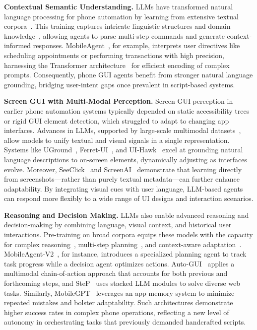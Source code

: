 \noindent\textbf{Contextual Semantic Understanding.}
LLMs have transformed natural language processing for phone automation by learning from extensive textual corpora~\cite{vaswani2017attention,brown2020language,radford2018improving,devlin2018bert,wen2024autodroid,zhang2023appagent}. This training captures intricate linguistic structures and domain knowledge~\cite{karanikolas2023large}, allowing agents to parse multi-step commands and generate context-informed responses. MobileAgent~\cite{wang2024mobileagentv1}, for example, interprets user directives like scheduling appointments or performing transactions with high precision, harnessing the Transformer architecture~\cite{vaswani2017attention} for efficient encoding of complex prompts. Consequently, phone GUI agents benefit from stronger natural language grounding, bridging user-intent gaps once prevalent in script-based systems.


\noindent\textbf{Screen GUI with Multi-Modal Perception.}
Screen GUI perception in earlier phone automation systems typically depended on static accessibility trees or rigid GUI element detection, which struggled to adapt to changing app interfaces. Advances in LLMs, supported by large-scale multimodal datasets~\cite{zhao2023survey,chang2024survey,minaee2024large}, allow models to unify textual and visual signals in a single representation. Systems like UGround~\cite{gou2024navigating}, Ferret-UI~\cite{you2024ferret}, and UI-Hawk~\cite{zhang2024ui-hawk} excel at grounding natural language descriptions to on-screen elements, dynamically adjusting as interfaces evolve. Moreover, SeeClick~\cite{cheng2024seeclick} and ScreenAI~\cite{baechler2024screenai} demonstrate that learning directly from screenshots—rather than purely textual metadata—can further enhance adaptability. By integrating visual cues with user language, LLM-based agents can respond more flexibly to a wide range of UI designs and interaction scenarios.


\noindent\textbf{Reasoning and Decision Making.}
LLMs also enable advanced reasoning and decision-making by combining language, visual context, and historical user interactions. Pre-training on broad corpora equips these models with the capacity for complex reasoning~\cite{wang2023can,yuan2024advancing}, multi-step planning~\cite{song2023llm,valmeekam2023planning}, and context-aware adaptation~\cite{talukdar2024improving,koike2024outfox}. MobileAgent-V2~\cite{wang2024mobileagentv2}, for instance, introduces a specialized planning agent to track task progress while a decision agent optimizes actions. Auto-GUI~\cite{zhang2023youautoui} applies a multimodal chain-of-action approach that accounts for both previous and forthcoming steps, and SteP~\cite{sodhi2024step} uses stacked LLM modules to solve diverse web tasks. Similarly, MobileGPT~\cite{lee2023exploremobilegpt} leverages an app memory system to minimize repeated mistakes and bolster adaptability. Such architectures demonstrate higher success rates in complex phone operations, reflecting a new level of autonomy in orchestrating tasks that previously demanded handcrafted scripts.


